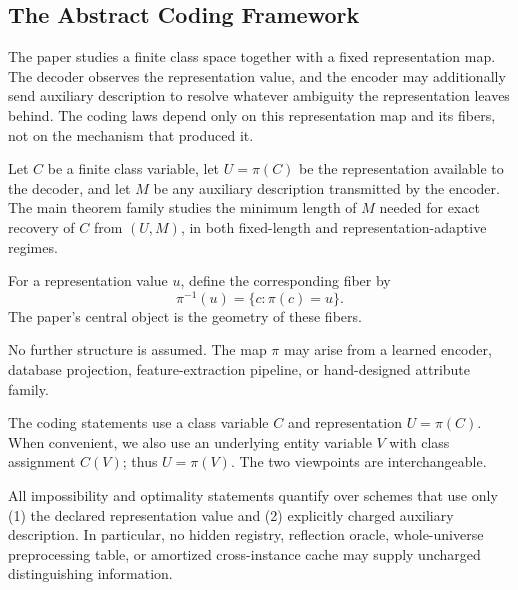 \subsection{The Abstract Coding Framework}

The paper studies a finite class space together with a fixed representation map. The decoder observes the representation value, and the encoder may additionally send auxiliary description to resolve whatever ambiguity the representation leaves behind. The coding laws depend only on this representation map and its fibers, not on the mechanism that produced it.

\begin{definition}
Let $C$ be a finite class variable, let $U=\pi(C)$ be the representation available to the decoder, and let $M$ be any auxiliary description transmitted by the encoder. The main theorem family studies the minimum length of $M$ needed for exact recovery of $C$ from $(U,M)$, in both fixed-length and representation-adaptive regimes.
\end{definition}

\begin{definition}
For a representation value $u$, define the corresponding fiber by
\[
\pi^{-1}(u) = \{c : \pi(c)=u\}.
\]
The paper's central object is the geometry of these fibers.
\end{definition}

\begin{remark}
No further structure is assumed. The map $\pi$ may arise from a learned encoder, database projection, feature-extraction pipeline, or hand-designed attribute family.
\end{remark}

\begin{remark}
The coding statements use a class variable $C$ and representation $U=\pi(C)$. When convenient, we also use an underlying entity variable $V$ with class assignment $C(V)$; thus $U=\pi(V)$. The two viewpoints are interchangeable.
\end{remark}

\begin{definition}\label{def:admissibility-contract}
All impossibility and optimality statements quantify over schemes that use only (1) the declared representation value and (2) explicitly charged auxiliary description. In particular, no hidden registry, reflection oracle, whole-universe preprocessing table, or amortized cross-instance cache may supply uncharged distinguishing information.
\end{definition}

